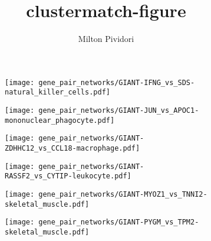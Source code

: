 \documentclass{memoir}
\title{clustermatch-figure}
\author{Milton Pividori}
\begin{document}
    \pagecolor{white}

\begin{figure}
     \centering
     \begin{subfigure}[b]{0.3\textwidth}
         \centering
         \texttt{[image: gene\_pair\_networks/GIANT-IFNG\_vs\_SDS-natural\_killer\_cells.pdf]}
     \end{subfigure}
     \hfill
     \begin{subfigure}[b]{0.3\textwidth}
         \centering
         \texttt{[image: gene\_pair\_networks/GIANT-JUN\_vs\_APOC1-mononuclear\_phagocyte.pdf]}
     \end{subfigure}
     \hfill
     \begin{subfigure}[b]{0.3\textwidth}
         \centering
         \texttt{[image: gene\_pair\_networks/GIANT-ZDHHC12\_vs\_CCL18-macrophage.pdf]}
     \end{subfigure}
     \hfill
     \begin{subfigure}[b]{0.3\textwidth}
         \centering
         \texttt{[image: gene\_pair\_networks/GIANT-RASSF2\_vs\_CYTIP-leukocyte.pdf]}
     \end{subfigure}
     \hfill
     \begin{subfigure}[b]{0.3\textwidth}
         \centering
         \texttt{[image: gene\_pair\_networks/GIANT-MYOZ1\_vs\_TNNI2-skeletal\_muscle.pdf]}
     \end{subfigure}
     \hfill
     \begin{subfigure}[b]{0.3\textwidth}
         \centering
         \texttt{[image: gene\_pair\_networks/GIANT-PYGM\_vs\_TPM2-skeletal\_muscle.pdf]}
     \end{subfigure}
\end{figure}

\end{document}
